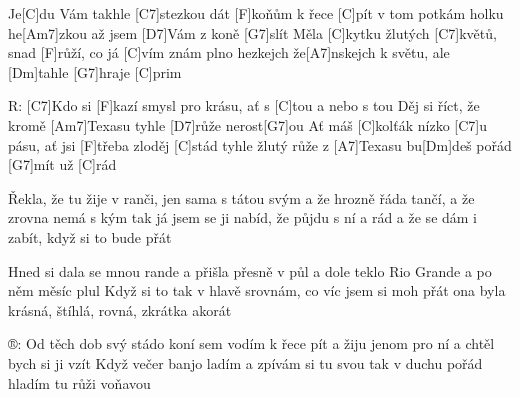 
Je[C]du Vám takhle [C7]stezkou dát [F]koňům k řece [C]pít
v tom potkám holku he[Am7]zkou až jsem [D7]Vám z koně [G7]slít
Měla [C]kytku žlutých [C7]květů, snad [F]růží, co já [C]vím
znám plno hezkejch že[A7]nskejch k světu, ale [Dm]tahle [G7]hraje [C]prim

R: [C7]Kdo si [F]kazí smysl pro krásu, ať s [C]tou a nebo s tou
Děj si říct, že kromě [Am7]Texasu tyhle [D7]růže nerost[G7]ou
Ať máš [C]kolťák nízko [C7]u pásu, ať jsi [F]třeba zloděj [C]stád
tyhle žlutý růže z [A7]Texasu bu[Dm]deš pořád [G7]mít už [C]rád


Řekla, že tu žije v ranči, jen sama s tátou svým
a že hrozně řáda tančí, a že zrovna nemá s kým
tak já jsem se ji nabíd, že půjdu s ní a rád
a že se dám i zabít, když si to bude přát

Hned si dala se mnou rande a přišla přesně v půl
a dole teklo Rio Grande a po něm měsíc plul
Když si to tak v hlavě srovnám, co víc jsem si moh přát
ona byla krásná, štíhlá, rovná, zkrátka akorát

®:
Od těch dob svý stádo koní sem vodím k řece pít
a žiju jenom pro ní a chtěl bych si ji vzít
Když večer banjo ladím a zpívám si tu svou
tak v duchu pořád hladím tu růži voňavou


